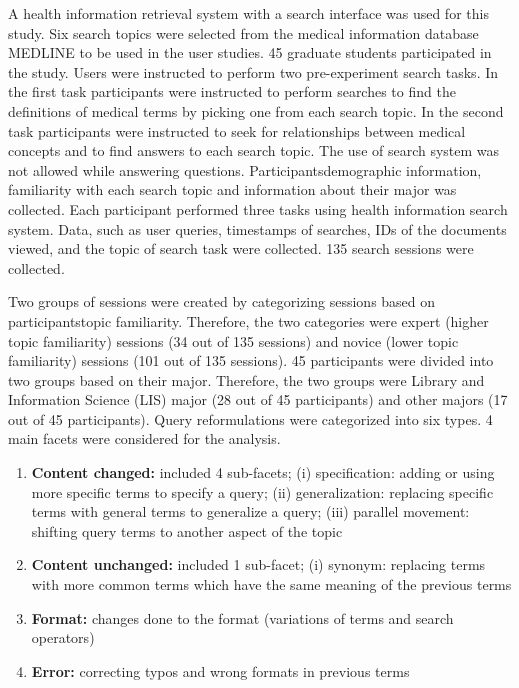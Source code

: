 \documentclass[]{article}
\begin{document}
\begin{enumerate}
A health information retrieval system with a search interface was used for this study. Six search topics were selected from the medical information database MEDLINE to be used in the user studies. 45 graduate students participated in the study. Users were instructed to perform two pre-experiment search tasks. In the first task participants were instructed to perform searches to find the definitions of medical terms by picking one from each search topic. In the second task participants were instructed to seek for relationships between medical concepts and to find answers to each search topic. The use of search system was not allowed while answering questions. Participants\textquotesingle demographic information, familiarity with each search topic and information about their major was collected. Each participant performed three tasks using health information search system. Data, such as user queries, timestamps of searches, IDs of the documents viewed, and the topic of search task were collected. 135 search sessions were collected. 

Two groups of sessions were created by categorizing sessions based on participants\textquotesingle  topic familiarity. Therefore, the two categories were expert (higher topic familiarity) sessions (34 out of 135 sessions) and novice (lower topic familiarity) sessions (101 out of 135 sessions). 45 participants were divided into two groups based on their major. Therefore, the two groups were Library and Information Science (LIS) major (28 out of 45 participants) and other majors (17 out of 45 participants). Query reformulations were categorized into six types. 4 main facets were considered for the analysis. 

\begin{enumerate}
	\item \textbf{Content changed:} included 4 sub-facets; (i) specification: adding or using more specific terms to specify a query; (ii) generalization: replacing specific terms with general terms to generalize a query; (iii) parallel movement: shifting query terms to another aspect of the topic
	
	\item \textbf{Content unchanged:} included 1 sub-facet; (i) synonym: replacing terms with more common terms which have the same meaning of the previous terms
	
	\item \textbf{Format:} changes done to the format (variations of terms and search operators)
	
	\item \textbf{Error:} correcting typos and wrong formats in previous terms 
\end{enumerate}



\end{enumerate}
\end{document}
